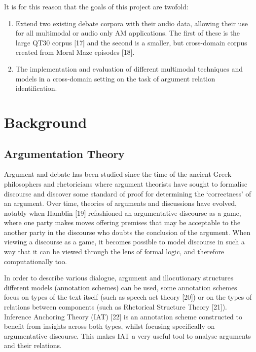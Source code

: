 \documentclass[twocolumn,twoside]{article}
\providecommand{\tightlist}{%
  \setlength{\itemsep}{0pt}\setlength{\parskip}{0pt}}
\begin{document}
It is for this reason that the goals of this project are twofold:

\begin{enumerate}
\def\labelenumi{(\roman{enumi})}
\tightlist
\item
  Extend two existing debate corpora with their audio data, allowing
  their use for all multimodal or audio only AM applications. The first
  of these is the large QT30 corpus {[}17{]} and the second is a
  smaller, but cross-domain corpus created from Moral Maze episodes
  {[}18{]}.
\item
  The implementation and evaluation of different multimodal techniques
  and models in a cross-domain setting on the task of argument relation
  identification.
\end{enumerate}

\section{Background}\label{background}

\subsection{Argumentation Theory}\label{argumentation-theory}

Argument and debate has been studied since the time of the ancient Greek
philosophers and rhetoricians where argument theorists have sought to
formalise discourse and discover some standard of proof for determining
the `correctness' of an argument. Over time, theories of arguments and
discussions have evolved, notably when Hamblin {[}19{]} refashioned an
argumentative discourse as a game, where one party makes moves offering
premises that may be acceptable to the another party in the discourse
who doubts the conclusion of the argument. When viewing a discourse as a
game, it becomes possible to model discourse in such a way that it can
be viewed through the lens of formal logic, and therefore
computationally too.

In order to describe various dialogue, argument and illocutionary
structures different models (annotation schemes) can be used, some
annotation schemes focus on types of the text itself (such as speech act
theory {[}20{]}) or on the types of relations between components (such
as Rhetorical Structure Theory {[}21{]}). Inference Anchoring Theory
(IAT) {[}22{]} is an annotation scheme constructed to benefit from
insights across both types, whilst focusing specifically on
argumentative discourse. This makes IAT a very useful tool to analyse
arguments and their relations.
\end{document}
